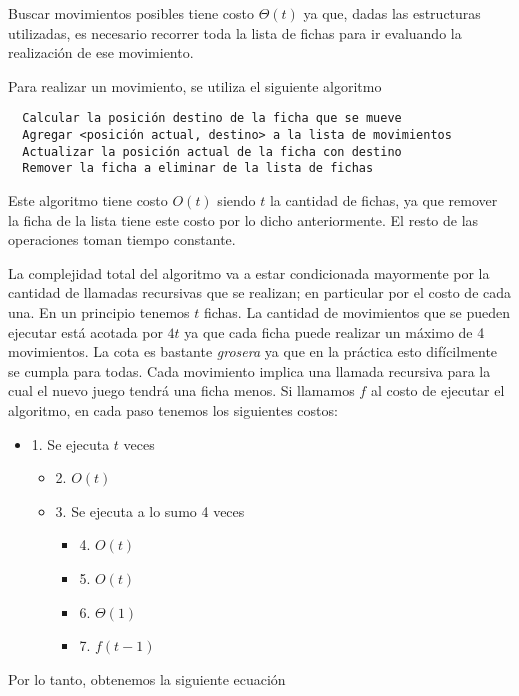 \documentclass[10pt, a4paper,english,spanish]{article}
\begin{document}
Buscar movimientos posibles tiene costo $\Theta(t)$ ya que, dadas las estructuras utilizadas,
es necesario recorrer toda la lista de fichas para ir evaluando la realización de ese movimiento.

Para realizar un movimiento, se utiliza el siguiente algoritmo

\begin{verbatim}
  Calcular la posición destino de la ficha que se mueve
  Agregar <posición actual, destino> a la lista de movimientos
  Actualizar la posición actual de la ficha con destino
  Remover la ficha a eliminar de la lista de fichas
\end{verbatim}

Este algoritmo tiene costo $O(t)$ siendo $t$ la cantidad de fichas, ya que
remover la ficha de la lista tiene este costo por lo dicho anteriormente. El resto
de las operaciones toman tiempo constante.

La complejidad total del algoritmo va a estar condicionada mayormente por la cantidad de llamadas
recursivas que se realizan; en particular por el costo de cada una. 
En un principio tenemos $t$ fichas. La cantidad de movimientos que
se pueden ejecutar está acotada por $4t$ ya que cada ficha puede realizar un máximo de 4 movimientos.
La cota es bastante \textit{grosera} ya que en la práctica esto difícilmente se cumpla para todas.
Cada movimiento implica una llamada recursiva para la cual el nuevo juego tendrá una ficha menos. 
Si llamamos $f$ al costo de ejecutar el algoritmo, en cada paso tenemos los siguientes costos: 

\begin{itemize}
 \item 1. Se ejecuta $t$ veces
  \begin{itemize}
  \item 2. $O(t)$ 
  \item 3. Se ejecuta a lo sumo 4 veces
  \begin{itemize}
    \item 4. $O(t)$
    \item 5. $O(t)$
    \item 6. $\Theta(1)$
    \item 7. $f(t-1)$
  \end{itemize}
  \end{itemize}
\end{itemize}

Por lo tanto, obtenemos la siguiente ecuación

\end{document}
